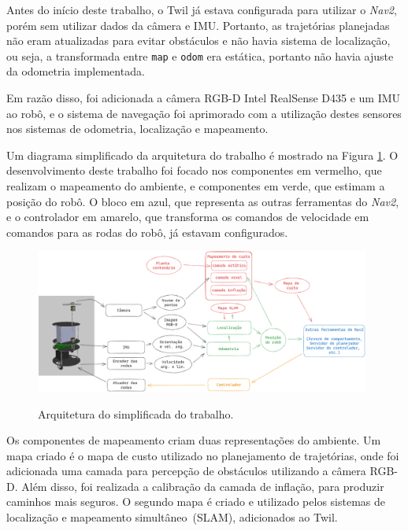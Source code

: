 \documentclass[repeatfields,xlists,xpacks,oneside,yearsonly]{ufrgscca}
\begin{document}
Antes do início deste trabalho, o Twil já estava configurada para
utilizar o \textit{Nav2}, porém sem utilizar dados da câmera e IMU.
Portanto, as trajetórias planejadas não eram atualizadas para evitar
obstáculos e não havia sistema de localização, ou seja, a
transformada entre \texttt{map} e \texttt{odom} era estática,
portanto não havia ajuste da odometria implementada.

Em razão disso, foi adicionada a câmera RGB-D Intel RealSense D435 e
um IMU ao robô, e o sistema de navegação foi aprimorado com a
utilização destes sensores nos sistemas de odometria, localização e
mapeamento.

Um diagrama simplificado da arquitetura do trabalho é mostrado na
Figura \ref{fig:arq_trabalho}. O desenvolvimento deste trabalho foi
focado nos componentes em vermelho, que realizam o mapeamento do
ambiente, e componentes em verde, que estimam a posição do robô. O
bloco em azul, que representa as outras ferramentas do \textit{Nav2},
e o controlador em amarelo, que transforma os comandos de velocidade
em comandos para as rodas do robô, já estavam configurados.

\begin{figure}[h]
    {
        \centering
        \caption{Arquitetura do simplificada do trabalho.}
        \label{fig:arq_trabalho}
        \includegraphics[width=0.98\textwidth]{arquitetura_simplificadav3.png}\\
    }
\end{figure}

Os componentes de mapeamento criam duas representações do ambiente.
Um mapa criado é o mapa de custo utilizado no planejamento de
trajetórias, onde foi adicionada uma camada para percepção de
obstáculos utilizando a câmera RGB-D. Além disso, foi realizada a
calibração da camada de inflação, para produzir caminhos mais
seguros. O segundo mapa é criado e utilizado pelos sistemas de
localização e mapeamento simultâneo~(SLAM), adicionados ao Twil.
\end{document}

